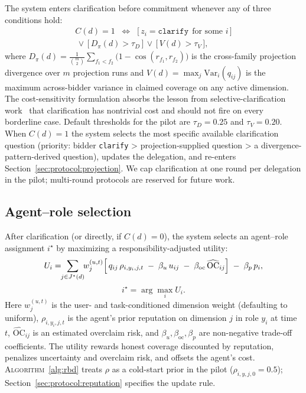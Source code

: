 The system enters clarification before commitment whenever any of three conditions hold:
\begin{multline}
C(d) = 1 \;\;\Longleftrightarrow\;\; \big[\, z_i = \texttt{clarify} \;\,\text{for some}\,\, i \,\big] \\
\,\lor\, \big[\, D_\pi(d) > \tau_D \,\big] \,\lor\, \big[\, V(d) > \tau_V \,\big],
\label{eq:trigger}
\end{multline}
where $D_\pi(d) = \tfrac{1}{\binom{m}{2}} \sum_{f_1 < f_2} \bigl( 1 - \cos(r_{f_1}, r_{f_2}) \bigr)$ is the cross-family projection divergence over $m$ projection runs and $V(d) = \max_j \mathrm{Var}_i(q_{ij})$ is the maximum across-bidder variance in claimed coverage on any active dimension. The cost-sensitivity formulation absorbs the lesson from selective-clarification work~\cite{lhaw2024, cole2023selectivelyambig, lee2023selectiveambig} that clarification has nontrivial cost and should not fire on every borderline case. Default thresholds for the pilot are $\tau_D = 0.25$ and $\tau_V = 0.20$. When $C(d) = 1$ the system selects the most specific available clarification question (priority: bidder \texttt{clarify} > projection-supplied question > a divergence-pattern-derived question), updates the delegation, and re-enters Section~\ref{sec:protocol:projection}. We cap clarification at one round per delegation in the pilot; multi-round protocols are reserved for future work.

\subsection{Agent--role selection}
\label{sec:protocol:selection}

After clarification (or directly, if $C(d) = 0$), the system selects an agent--role assignment $i^\star$ by maximizing a responsibility-adjusted utility:
\begin{equation}
U_i = \!\! \sum_{j \in J^*(d)} \!\! w_j^{(u, t)} \Bigl[\, q_{ij}\,\rho_{i, y_i, j, t} \;-\; \beta_u\, u_{ij} \;-\; \beta_{\text{oc}}\, \widehat{\text{OC}}_{ij} \Bigr] \;-\; \beta_p\, p_i,
\label{eq:utility}
\end{equation}
\begin{equation}
i^\star = \arg\max_i U_i.
\label{eq:select}
\end{equation}
Here $w_j^{(u, t)}$ is the user- and task-conditioned dimension weight (defaulting to uniform), $\rho_{i, y_i, j, t}$ is the agent's prior reputation on dimension $j$ in role $y_i$ at time $t$, $\widehat{\text{OC}}_{ij}$ is an estimated overclaim risk, and $\beta_u, \beta_{\text{oc}}, \beta_p$ are non-negative trade-off coefficients. The utility rewards honest coverage discounted by reputation, penalizes uncertainty and overclaim risk, and offsets the agent's cost. \textsc{Algorithm}~\ref{alg:rbd} treats $\rho$ as a cold-start prior in the pilot ($\rho_{i, y, j, 0} = 0.5$); Section~\ref{sec:protocol:reputation} specifies the update rule.

